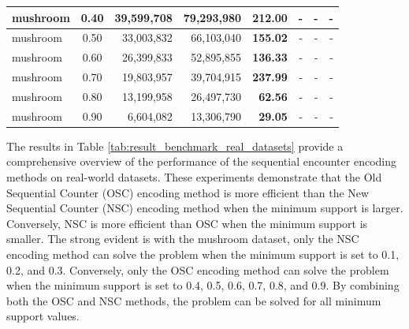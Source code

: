 \begin{table}[H]
\begin{tabular}{|l|c|r|r|r|r|r|r|}
        mushroom                          & 0.40                              & 39,599,708                                           & 79,293,980                                           & \textbf{212.00} & -             & -                & -               \\ \hline
        mushroom                          & 0.50                              & 33,003,832                                           & 66,103,040                                           & \textbf{155.02} & -             & -                & -               \\ \hline
        mushroom                          & 0.60                              & 26,399,833                                           & 52,895,855                                           & \textbf{136.33} & -             & -                & -               \\ \hline
        mushroom                          & 0.70                              & 19,803,957                                           & 39,704,915                                           & \textbf{237.99} & -             & -                & -               \\ \hline
        mushroom                          & 0.80                              & 13,199,958                                           & 26,497,730                                           & \textbf{62.56}  & -             & -                & -               \\ \hline
        mushroom                          & 0.90                              & 6,604,082                                            & 13,306,790                                           & \textbf{29.05}  & -             & -                & -               \\ \hline
    \end{tabular}
\end{table}

The results in Table \ref{tab:result_benchmark_real_datasets} provide a comprehensive overview of the performance of the sequential encounter encoding methods on real-world datasets.
These experiments demonstrate that the Old Sequential Counter (OSC) encoding method is more efficient than the New Sequential Counter (NSC) encoding method when the minimum support is larger.
Conversely, NSC is more efficient than OSC when the minimum support is smaller.
The strong evident is with the mushroom dataset, only the NSC encoding method can solve the problem when the minimum support is set to 0.1, 0.2, and 0.3. Conversely, only the OSC encoding method can solve the problem when the minimum support is set to 0.4, 0.5, 0.6, 0.7, 0.8, and 0.9. By combining both the OSC and NSC methods, the problem can be solved for all minimum support values.

